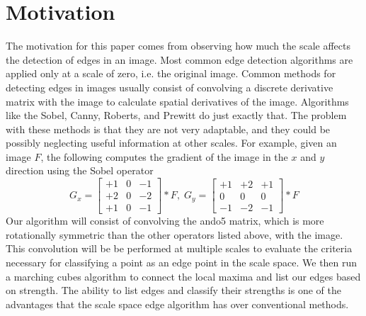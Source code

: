 \documentclass{article}
\begin{document}
\section{Motivation}
The motivation for this paper comes from observing how much the scale affects the detection of edges in an image. 
Most common edge detection algorithms are applied only at a scale of zero, i.e. the original image.
Common methods for detecting edges in images usually consist of convolving a discrete derivative matrix with the image to calculate spatial derivatives of the image.
Algorithms like the Sobel, Canny, Roberts, and Prewitt do just exactly that. 
The problem with these methods is that they are not very adaptable, and they could be possibly neglecting useful information at other scales. 
For example, given an image ${F}$, the following computes the gradient of the image in the $x$ and $y$ direction using the Sobel operator
\begin{equation}
	{G}_x =
	\begin{bmatrix}
		+1 &0 &-1 \\
		+2 &0 &-2 \\
		+1 &0 &-1 
	\end{bmatrix}
	* {F}, \;
	{G}_y =
	\begin{bmatrix}
		+1 &+2 &+1 \\
		0 &0 &0 \\
		-1 &-2 &-1 
	\end{bmatrix}
	* {F}
\end{equation}
Our algorithm will consist of convolving the ando5 matrix, which is more rotationally symmetric than the other operators listed above, with the image. 
This convolution will be be performed at multiple scales to evaluate the criteria necessary for classifying a point as an edge point in the scale space. 
We then run a marching cubes algorithm to connect the local maxima and list our edges based on strength. 
The ability to list edges and classify their strengths is one of the advantages that the scale space edge algorithm has over conventional methods. 
\end{document}
